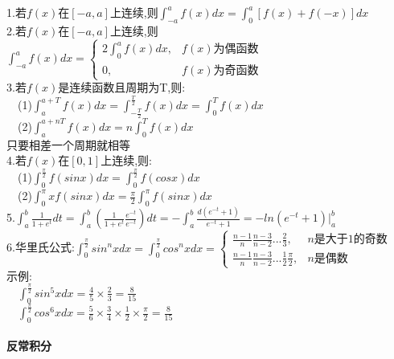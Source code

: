 \documentclass{article}
\begin{document}
\begin{flushleft}
	1.若$f(x)$在$[-a,a]$上连续,则$\int_{-a}^{a}f(x)dx=\int_{0}^{a}[f(x)+f(-x)]dx$\\
	2.若$f(x)$在$[-a,a]$上连续,则$\int_{-a}^{a}f(x)dx=\left\{
	\begin{array}{lcl}
	2\int_{0}^{a}f(x)dx, & f(x)\mbox{为偶函数}\\
	0, & f(x)\mbox{为奇函数}
	\end{array} \right.$\\
	3.若$f(x)$是连续函数且周期为T,则:\\
	\ \ (1)$\int_{a}^{a+T}f(x)dx=\int_{-\frac{T}{2}}^{\frac{T}{2}}f(x)dx=\int_{0}^{T}f(x)dx$\\
	\ \ (2)$\int_{a}^{a+nT}f(x)dx=n\int_{0}^{T}f(x)dx$\\
	只要相差一个周期就相等\\
	4.若$f(x)$在$[0,1]$上连续,则:\\
	\ \ (1)$\int_{0}^{\frac{\pi}{2}}f(sinx)dx=\int_{0}^{\frac{\pi}{2}}f(cosx)dx$\\
	\ \ (2)$\int_{0}^{\pi}xf(sinx)dx=\frac{\pi}{2}\int_{0}^{\pi}f(sinx)dx$\\
	5.$\int_{a}^{b}\frac{1}{1+e^t}dt=\int_{a}^{b}(\frac{1}{1+e^t}\frac{e^{-t}}{e^{-t}})dt=-\int_{a}^{b}\frac{d(e^{-t}+1)}{e^{-t}+1}=-ln(e^{-t}+1)|_a^b$\\
	6.华里氏公式:$\int_{0}^{\frac{\pi}{2}}sin^nxdx=\int_{0}^{\frac{\pi}{2}}cos^nxdx=\left\{
	\begin{array}{lcl}
	\frac{n-1}{n}\frac{n-3}{n-2}...\frac{2}{3}, & n\mbox{是大于1的奇数}\\
	\frac{n-1}{n}\frac{n-3}{n-2}...\frac{1}{2}\frac{\pi}{2}, & n\mbox{是偶数}
	\end{array} \right.$\\
	示例:\\
	\ \ $\int_{0}^{\frac{\pi}{2}}sin^5xdx=\frac{4}{5}\times\frac{2}{3}=\frac{8}{15}$\\
	\ \ $\int_{0}^{\frac{\pi}{2}}cos^6xdx=\frac{5}{6}\times\frac{3}{4}\times\frac{1}{2}\times\frac{\pi}{2}=\frac{8}{15}$\\
	
	~\\ \textbf{反常积分} \\~\\
	
	
\end{flushleft}
\end{document}
